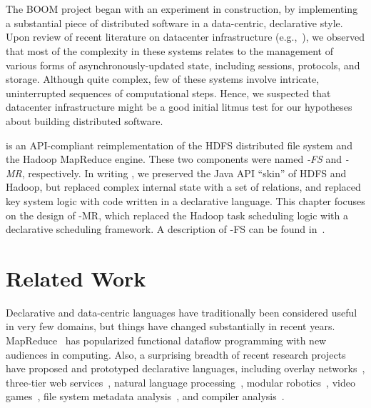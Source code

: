 \section{\BOOM}
\label{ch:boom:sec:boom}

The BOOM project began with an experiment in construction, by implementing a substantial piece of
distributed software in a data-centric, declarative style. Upon review of recent literature on
datacenter infrastructure (e.g.,~\cite{chubby,gfs-sosp,dynamo,mapreduce-osdi}),
we observed that most of the complexity in these systems relates to the
management of various forms of asynchronously-updated state, including sessions,
protocols, and storage. Although quite complex, few of these systems involve intricate, uninterrupted
sequences of computational steps. Hence, we suspected that datacenter
infrastructure might be a good initial litmus test for our hypotheses about building distributed software.

\emph{\BOOMA} is an API-compliant reimplementation of the HDFS distributed 
file system and the Hadoop MapReduce engine.  These two components were named \emph{\BOOM-FS} 
and \emph{\BOOM-MR}, respectively. In writing \BOOMA, we preserved the Java API ``skin'' of HDFS and 
Hadoop, but replaced complex internal state with a set of relations, and replaced key system logic with 
code written in a declarative language. This chapter focuses on the design of \BOOM-MR, which replaced 
the Hadoop task scheduling logic with a declarative scheduling framework. A description of \BOOM-FS can
be found in~\cite{boom}.

\section{Related Work}
\label{ch:boom:sec:relwork}

Declarative and data-centric languages have traditionally been considered useful
in very few domains, but things have changed substantially in recent years.
MapReduce~\cite{mapreduce-osdi} has popularized functional dataflow programming
with new audiences in computing.  Also, a surprising breadth of recent research
projects have proposed and prototyped declarative languages, including overlay
networks~\cite{p2:sosp}, three-tier web services~\cite{hilda}, natural language
processing~\cite{dyna}, modular robotics~\cite{meld}, video
games~\cite{cornellgames}, file system metadata analysis~\cite{wiscfsck}, and
compiler analysis~\cite{bddbddb}.

